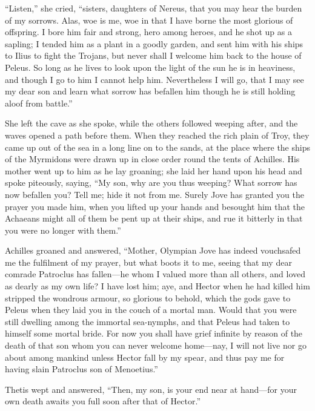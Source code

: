 “Listen,” she cried, “sisters, daughters of Nereus, that you may hear the
burden of my sorrows. Alas, woe is me, woe in that I have borne the most
glorious of offspring. I bore him fair and strong, hero among heroes, and
he shot up as a sapling; I tended him as a plant in a goodly garden, and
sent him with his ships to Ilius to fight the Trojans, but never shall I
welcome him back to the house of Peleus. So long as he lives to look upon
the light of the sun he is in heaviness, and though I go to him I cannot
help him. Nevertheless I will go, that I may see my dear son and learn
what sorrow has befallen him though he is still holding aloof from
battle.”

She left the cave as she spoke, while the others followed weeping after,
and the waves opened a path before them. When they reached the rich plain
of Troy, they came up out of the sea in a long line on to the sands, at
the place where the ships of the Myrmidons were drawn up in close order
round the tents of Achilles. His mother went up to him as he lay groaning;
she laid her hand upon his head and spoke piteously, saying, “My son, why
are you thus weeping? What sorrow has now befallen you? Tell me; hide it
not from me. Surely Jove has granted you the prayer you made him, when you
lifted up your hands and besought him that the Achaeans might all of them
be pent up at their ships, and rue it bitterly in that you were no longer
with them.”

Achilles groaned and answered, “Mother, Olympian Jove has indeed
vouchsafed me the fulfilment of my prayer, but what boots it to me, seeing
that my dear comrade Patroclus has fallen—he whom I valued more than
all others, and loved as dearly as my own life? I have lost him; aye, and
Hector when he had killed him stripped the wondrous armour, so glorious to
behold, which the gods gave to Peleus when they laid you in the couch of a
mortal man. Would that you were still dwelling among the immortal
sea-nymphs, and that Peleus had taken to himself some mortal bride. For
now you shall have grief infinite by reason of the death of that son whom
you can never welcome home—nay, I will not live nor go about among
mankind unless Hector fall by my spear, and thus pay me for having slain
Patroclus son of Menoetius.”

Thetis wept and answered, “Then, my son, is your end near at hand—for
your own death awaits you full soon after that of Hector.”

